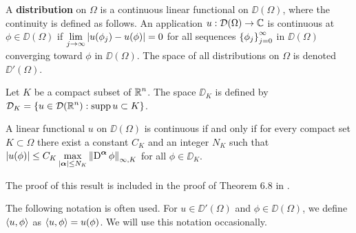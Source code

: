 A {\bfseries distribution} on $\Omega$ is a
continuous linear functional on $\DD(\Omega)$, where the continuity is
defined as follows.  An application $u:\mathcal{D}(\Omega) \rightarrow \mathbb{C}$ is
continuous at $\phi \in \DD(\Omega)$ if
$\displaystyle \lim_{j\rightarrow \infty}|u(\phi_j)-u(\phi)| = 0$
for all sequences $\displaystyle \left\{ \phi_j\right\}_{j=0}^\infty$ in
$\DD(\Omega)$ converging toward $\phi$ in $\DD(\Omega)$.
The space of all distributions on $\Omega$ is denoted $\DD'(\Omega)$.

Let $K$ be a compact subset of $\displaystyle \mathbb{R}^n$.  The space
$\DD_K$ is defined by\\
$\displaystyle \mathcal{D}_K = \left\{ u \in \mathcal{D}(\mathbb{R}^n) : \operatorname{supp} u \subset K \right\}$.

\begin{prop} \label{distr_cont_cond}
A linear functional $u$ on $\DD(\Omega)$ is continuous if and only if
for every compact set $K \subset \Omega$ there exist a constant $C_K$
and an integer $N_K$ such that
$\displaystyle \left| u(\phi) \right| \leq C_K \max_{|{\bm{\alpha}}|\leq N_K}
\left\| \operatorname{D}^{{\bm{\alpha}}} \phi \right\|_{\infty,K}$
for all $\phi \in \DD_K$.
\end{prop}

The proof of this result is included in the proof of Theorem 6.8 in
\cite{RuFA}.

\begin{rmk}
The following notation is often used.  For $u \in \DD'(\Omega)$ and
$\phi \in \DD(\Omega)$, we define $\left\langle{u} , {\phi}\right\rangle$ as
$\left\langle{u} , {\phi}\right\rangle = u(\phi)$.  We will use this notation occasionally.
\end{rmk}

